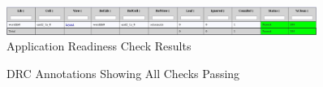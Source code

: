 \documentclass{article}
\begin{document}
	\begin{figure}[H]
		\centerline{\includegraphics[width=0.9\textwidth]{and_application_readiness_check.png}}
		\caption{Application Readiness Check Results}
		\label{fig::or_application_readiness_check}
	\end{figure}
	
	\begin{figure}[H]
		\centerline{}
		\caption{DRC Annotations Showing All Checks Passing}
		\label{fig::or_drc}
	\end{figure}
\end{document}
